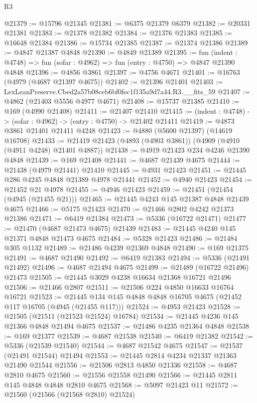 \begin{lexlean}{R3}
\begin{coremodule}
@21379 := @15796 @21345
@21381 := @6375 @21379 @6379
@21382 := @20331 @21381
@21383 := @21378 @21382
@21384 := @21376 @21383
@21385 := @16648 @21384
@21386 := @15734 @21385
@21387 := @21374 @21386
@21389 := @4847 @21387 @4848
@21390 := @4849 @21389
@21395 := fun (indent : @4748) => fun (sofar : @4962) => fun (entry : @4750) => @4847 @21390 @4848
@21396 := @4856 @3861
@21397 := @4756 @4671
@21401 := @16763 (@4979 (@4687 @21397 @4675))
@21402 := @21396 @21401
@21403 := LexLeanPreserve.Cbed2a57b08ceb6bf0fec1f135a9d7a44.R3.__fits_59
@21407 := @4862 (@21403 @5556 @4977 @4671)
@21408 := @15737 @21385
@21410 := @169 (@4990 @21408)
@21411 := @21407 @21410
@21415 := (indent : @4748) -> (sofar : @4962) -> (entry : @4750) -> @21402 @21411
@21419 := @4873 @3861 @21401 @21411 @4248
@21423 := @4880 (@5600 @21397) (@14619 @16708)
@21433 := @21419 @21423 (@4893 (@4903 @3861)) (@4909 (@4910 (@4911 @4248) @21401 @4887))
@21438 := @4919 @21423 @234 @4246 @21390 @4848
@21439 := @169 @21408
@21441 := @4687 @21439 @4675
@21444 := @21438 (@4979 @21441) @21410
@21445 := @4931 @21423
@21451 := @21445 @286 @4245 @4848 @21389 @4978 @21441
@21452 := @4940 @21423
@21454 := @21452 @21 @4978
@21455 := @4946 @21423
@21459 := @21451 (@21454 (@4945 (@21455 @21)))
@21465 := @21445 @4243 @145 @21387 @4848 @21439 @4675
@21466 := @5175 @21423
@21470 := @21466 @2802 @4242 @21373 @21386
@21471 := @6419 @21384
@21473 := @5336 (@16722 @21471)
@21477 := @21470 (@4687 @21473 @4675) @21439
@21483 := @21445 @4240 @145 @21371 @4848 @21473 @4675
@21484 := @5328 @21423
@21486 := @21484 @305 @1132
@21489 := @21486 @4239 @21369 @4848
@21490 := @169 @21375
@21491 := @4687 @21490
@21492 := @6419 @21383
@21494 := @5336 (@21491 @21492)
@21496 := @4687 @21494 @4675
@21499 := @21489 (@16722 @21496) @21473
@21505 := @21445 @3029 @4238 @16634 @21368 @16721 @21496
@21506 := @21466 @2807
@21511 := @21506 @224 @4850 @16633 @16764 @16721
@21523 := @21445 @134 @145 @4848 @4848 @16705 @4675 (@21452 @117 @16705 (@4945 (@21455 @117)))
@21524 := @4953 @21423
@21528 := @21505 (@21511 (@21523 @21524) @16784)
@21534 := @21445 @4236 @145 @21366 @4848 @21494 @4675
@21537 := @21486 @4235 @21364 @4848
@21538 := @169 @21377
@21539 := @4687 @21538
@21540 := @6419 @21382
@21542 := @5336 (@21539 @21540)
@21544 := @4687 @21542 @4675
@21547 := @21537 (@21491 @21544) @21494
@21553 := @21445 @2814 @4234 @21337 @21363 @21490 @21544
@21556 := @21506 @2813 @4850 @21336
@21558 := @4687 @2810 @4675
@21560 := @21556 @21558 @21490
@21566 := @21445 @2811 @145 @4848 @4848 @2810 @4675
@21568 := @5097 @21423 @11
@21572 := @21560 (@21566 (@21568 @2810) @21524)

\end{coremodule}
\end{lexlean}
